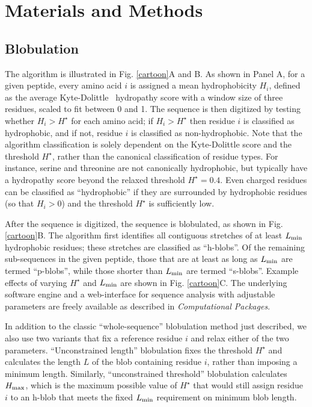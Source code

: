 \documentclass[9pt,twocolumn,twoside,lineno]{pnas-new}
\newcommand{\aucomment}[1]{}
\newcommand{\inserted}[1]{{#1}}
\newcommand{\cmax}{H_{\rm max}}
\newcommand{\Ht}{H^{\star}}
\newcommand{\Lmin}{L_{\rm min}}
\begin{document}
\section*{Materials and Methods}

\subsection*{Blobulation}
\aucomment{This explanation is a major revision of the previous version.}
\inserted{The algorithm is illustrated in Fig. \ref{cartoon}A and B. As shown in Panel A, for a given peptide, every amino acid $i$ is assigned a mean hydrophobicity $H_i$, defined as the average Kyte-Dolittle~\citep{Kyte1982} hydropathy score with a window size of three residues, scaled to fit between 0 and 1. The sequence is then digitized by testing whether $H_i>\Ht$ for each amino acid; if $H_i>\Ht$ then residue $i$ is classified as hydrophobic, and if not, residue $i$ is classified as non-hydrophobic. Note that the algorithm classification is solely dependent on the Kyte-Dolittle score and the threshold $\Ht$, rather than the canonical classification of residue types. For instance, serine and threonine are not canonically hydrophobic, but typically have a hydropathy score beyond the relaxed threshold $\Ht=0.4$. Even charged residues can be classified as ``hydrophobic'' if they are surrounded by hydrophobic residues (so that $H_i>0$) and the threshold $\Ht$ is sufficiently low. }  

\inserted{After the sequence is digitized, the sequence is blobulated, as shown in Fig. \ref{cartoon}B. The algorithm first identifies all contiguous stretches of at least $\Lmin$ hydrophobic residues; these stretches are classified as ``h-blobs''. Of the remaining sub-sequences in the given peptide, those that are at least as long as $\Lmin$ are termed ``p-blobs'', while those shorter than $\Lmin$ are termed ``s-blobs''. Example effects of varying $\Ht$ and $\Lmin$ are shown in Fig. \ref{cartoon}C. The underlying software engine and a web-interface for sequence analysis with adjustable parameters are freely available as described in {\em Computational Packages}}.

\inserted{In addition to the classic ``whole-sequence'' blobulation method just described, we also use two variants that fix a reference residue $i$ and relax either of the two parameters.  ``Unconstrained length'' blobulation fixes the threshold $\Ht$ and calculates the length $L$ of the blob containing residue $i$, rather than imposing a minimum length. Similarly, ``unconstrained threshold'' blobulation calculates $\cmax$, which is the maximum possible value of $\Ht$ that would still assign residue $i$ to an h-blob that meets the fixed $\Lmin$ requirement on minimum blob length. }
\end{document}
